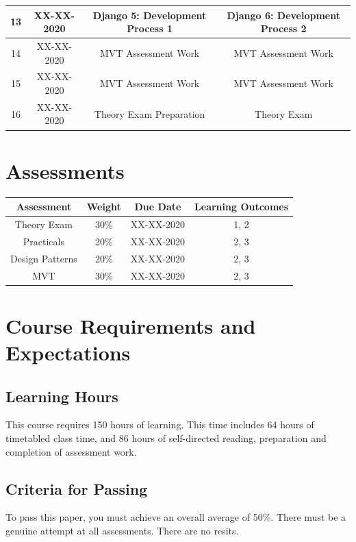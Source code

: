 \documentclass{article}
\begin{document}
\begin{tabular}{|c|c|c|c|}
	13            & XX-XX-2020    & Django 5: Development Process 1     & Django 6: Development Process 2 \\ \hline
	14            & XX-XX-2020    & MVT Assessment Work                 & MVT Assessment Work             \\ \hline
	15            & XX-XX-2020    & MVT Assessment Work                 & MVT Assessment Work             \\ \hline
	16            & XX-XX-2020    & Theory Exam Preparation             & Theory Exam                     \\ \hline
\end{tabular}

\section*{Assessments}
\renewcommand{\arraystretch}{1.5}
\begin{tabular}{|c|c|c|c|}
	\hline
	\textbf{Assessment} & \textbf{Weight} & \textbf{Due Date} & \textbf{Learning Outcomes} \\ \hline
	Theory Exam         & 30\%            & XX-XX-2020        & 1, 2                       \\ \hline
	Practicals          & 20\%            & XX-XX-2020        & 2, 3                       \\ \hline
	Design Patterns     & 20\%            & XX-XX-2020        & 2, 3                       \\ \hline
	MVT                 & 30\%            & XX-XX-2020        & 2, 3                       \\ \hline
			
\end{tabular}

\section*{Course Requirements and Expectations}

\subsection*{Learning Hours}
This course requires 150 hours of learning. This time includes 64 hours of timetabled class time, and 86 hours of self-directed reading, preparation and completion of assessment work.

\subsection*{Criteria for Passing}
To pass this paper, you must achieve an overall average of 50\%. There must be a genuine attempt at all assessments. There are no resits.
\end{document}
